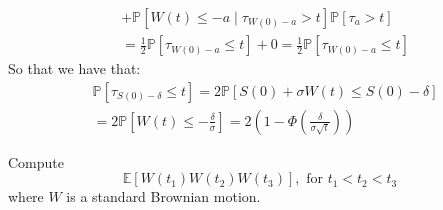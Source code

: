 \documentclass[12pt,twoside, letter]{exam}
\theoremstyle{definition}
\newcommand{\ee}{\mathbb{E}}
\newcommand{\pp}{\mathbb{P}}
\begin{document}
\begin{enumerate}
\begin{solution}
\begin{align*}
          &+ \pp[W(t) \leq -a \mid \tau_{W(0) - a} > t] \pp[\tau_{a} > t] \\
          &= \frac{1}{2} \pp[\tau_{W(0) - a} \leq t] + 0 = \frac{1}{2}\pp[\tau_{W(0) - a} \leq t]
        \end{align*}
        So that we have that:
        \begin{align*}
          &\pp[\tau_{S(0)-\delta} \leq t] = 2\pp[S(0) + \sigma W(t) \leq S(0) - \delta] \\
          &= 2\pp[W(t) \leq -\frac{\delta}{\sigma}] = 2(1-\Phi(\frac{\delta}{\sigma\sqrt{t}}))
        \end{align*}
      \end{solution}
\end{enumerate}


\par{Compute}
\begin{equation*}
  \ee[W(t_1)W(t_2)W(t_3)], \text{ for $t_1 < t_2 < t_3$}
\end{equation*}
where $W$ is a standard Brownian motion.
\end{document}
